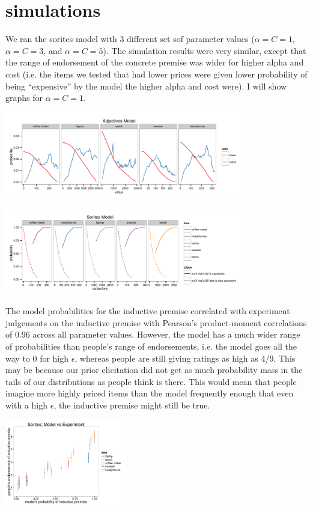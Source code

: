 \documentclass[10pt]{article}
\begin{document}
\section{simulations}

  We ran the sorites model with 3 different set sof parameter values ($\alpha=C=1$, $\alpha=C=3$, and $\alpha=C=5$). The simulation results were very similar, except that the range of endorsement of the concrete premise was wider for higher alpha and cost (i.e. the items we tested that had lower prices were given lower probability of being ``expensive'' by the model the higher alpha and cost were). I will show graphs for $\alpha=C=1$.
  
  \includegraphics[width=0.8\textwidth]{adjective_alpha1_cost1.pdf}
  
  \includegraphics[width=0.8\textwidth]{sorites_model_alpha1_cost1.pdf}
  
  The model probabilities for the inductive premise correlated with experiment judgements on the inductive premise with Pearson's product-moment correlations of 0.96 across all parameter values. However, the model has a much wider range of probabilities than people's range of endorsements, i.e. the model goes all the way to 0 for high $\epsilon$, whereas people are still giving ratings as high as 4/9. This may be because our prior elicitation did not get as much probability mass in the tails of our distributions as people think is there. This would mean that people imagine more highly priced items than the model frequently enough that even with a high $\epsilon$, the inductive premise might still be true.
  
  \includegraphics[width=0.4\textwidth]{sorites-model-vs-people_alpha1_cost1.pdf}
  
\end{document}
